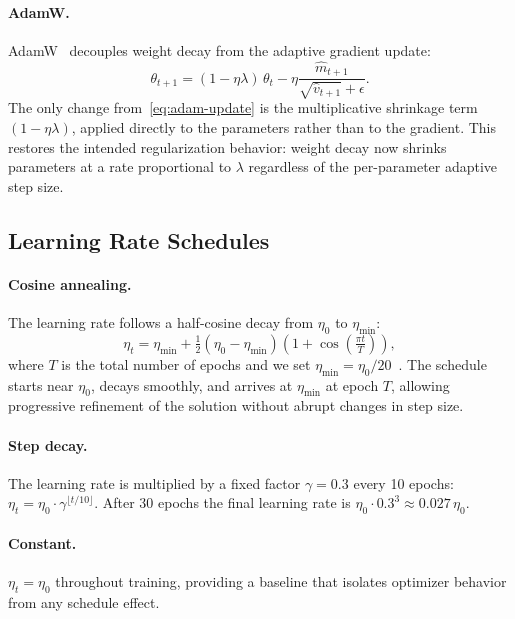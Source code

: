 \documentclass[11pt]{article}
\begin{document}
\paragraph{AdamW.}
AdamW~\cite{loshchilov2019adamw} decouples weight decay from the adaptive
gradient update:
\begin{equation}
  \theta_{t+1} = (1 - \eta\lambda)\,\theta_t
                 - \eta \frac{\hat{m}_{t+1}}{\sqrt{\hat{v}_{t+1}} + \epsilon}.
  \label{eq:adamw}
\end{equation}
The only change from~\eqref{eq:adam-update} is the multiplicative shrinkage
term $(1 - \eta\lambda)$, applied directly to the parameters rather than to
the gradient. This restores the intended regularization behavior: weight decay
now shrinks parameters at a rate proportional to $\lambda$ regardless of the
per-parameter adaptive step size.

\subsection{Learning Rate Schedules}

\paragraph{Cosine annealing.}
The learning rate follows a half-cosine decay from $\eta_0$ to $\eta_\text{min}$:
\begin{equation}
  \eta_t = \eta_\text{min} + \tfrac{1}{2}(\eta_0 - \eta_\text{min})
           \left(1 + \cos\!\left(\tfrac{\pi t}{T}\right)\right),
  \label{eq:cosine}
\end{equation}
where $T$ is the total number of epochs and we set
$\eta_\text{min} = \eta_0 / 20$~\cite{loshchilov2017sgdr}.
The schedule starts near $\eta_0$, decays smoothly, and arrives at $\eta_\text{min}$
at epoch $T$, allowing progressive refinement of the solution without abrupt
changes in step size.

\paragraph{Step decay.}
The learning rate is multiplied by a fixed factor $\gamma = 0.3$ every 10 epochs:
$\eta_t = \eta_0 \cdot \gamma^{\lfloor t/10 \rfloor}$.
After 30 epochs the final learning rate is $\eta_0 \cdot 0.3^3 \approx 0.027\,\eta_0$.

\paragraph{Constant.}
$\eta_t = \eta_0$ throughout training, providing a baseline that isolates
optimizer behavior from any schedule effect.
\end{document}
